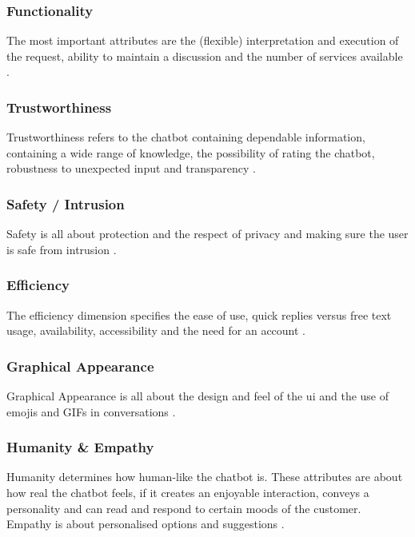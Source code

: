 \subsubsection{Functionality}
The most important attributes are the (flexible) interpretation and execution of the request, ability to maintain a discussion and the number of services available \citep*{Muizzah2021, Verkeyn2018}.

\subsubsection{Trustworthiness}
Trustworthiness refers to the chatbot containing dependable information, containing a wide range of knowledge, the possibility of rating the chatbot, robustness to unexpected input and transparency \citep*{Muizzah2021, Verkeyn2018}.

\subsubsection{Safety / Intrusion}
Safety is all about protection and the respect of privacy and making sure the user is safe from intrusion \citep*{Muizzah2021, Verkeyn2018}.

\subsubsection{Efficiency}
The efficiency dimension specifies the ease of use, quick replies versus free text usage, availability, accessibility and the need for an account \citep*{Muizzah2021, Verkeyn2018}.

\subsubsection{Graphical Appearance}
Graphical Appearance is all about the design and feel of the \acrshort{ui} and the use of emojis and GIFs in conversations \citep*{Muizzah2021, Verkeyn2018}.

\subsubsection{Humanity \& Empathy}
Humanity determines how human-like the chatbot is. These attributes are about how real the chatbot feels, if it creates an enjoyable interaction, conveys a personality and can read and respond to certain moods of the customer.\\
Empathy is about personalised options and suggestions \citep*{Muizzah2021, Verkeyn2018}.


